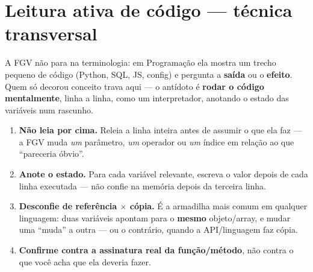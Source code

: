 \section{Leitura ativa de código --- técnica transversal}
\label{sec:leitura-ativa-programacao}

A FGV não para na terminologia: em Programação ela mostra um trecho pequeno
de código (Python, SQL, JS, config) e pergunta a \textbf{saída} ou o
\textbf{efeito}. Quem só decorou conceito trava aqui --- o antídoto é
\textbf{rodar o código mentalmente}, linha a linha, como um interpretador,
anotando o estado das variáveis num rascunho.

\begin{conceito}
\begin{enumerate}
\item \textbf{Não leia por cima.} Releia a linha inteira antes de assumir o
que ela faz --- a FGV muda \emph{um} parâmetro, \emph{um} operador ou
\emph{um} índice em relação ao que ``pareceria óbvio''.
\item \textbf{Anote o estado.} Para cada variável relevante, escreva o valor
depois de cada linha executada --- não confie na memória depois da terceira
linha.
\item \textbf{Desconfie de referência $\times$ cópia.} É a armadilha mais
comum em qualquer linguagem: duas variáveis apontam para o \textbf{mesmo}
objeto/array, e mudar uma ``muda'' a outra --- ou o contrário, quando a
API/linguagem faz cópia.
\item \textbf{Confirme contra a assinatura real da função/método}, não
contra o que você acha que ela deveria fazer.
\end{enumerate}
\end{conceito}

